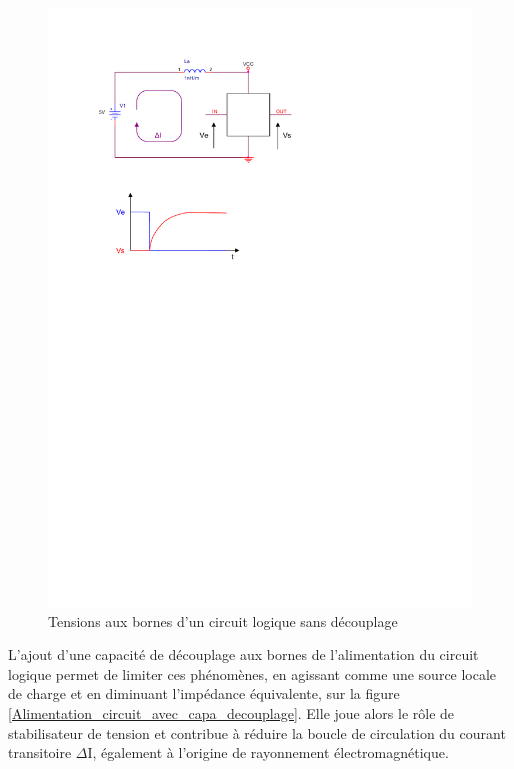 \documentclass[a4paper]{article}
\begin{document}
\begin{figure}[H]
	\centering
	\includegraphics[scale=1.00]{Images/Tensions_circuit_sans_decouplage}
	\caption{Tensions aux bornes d'un circuit logique sans découplage
		\label{Tensions_circuit_sans_decouplage}}
\end{figure}

L'ajout d'une capacité de découplage aux bornes de l'alimentation du circuit logique permet de limiter ces phénomènes, en agissant comme une source locale de charge et en diminuant l'impédance équivalente, sur la figure \ref{Alimentation_circuit_avec_capa_decouplage}. Elle joue alors le rôle de stabilisateur de tension et contribue à réduire la boucle de circulation du courant transitoire $\Delta$I, également à l'origine de rayonnement électromagnétique.
\end{document}
